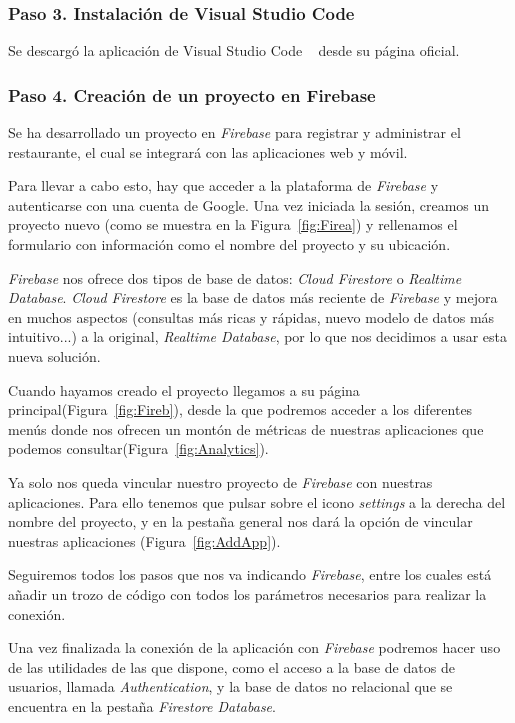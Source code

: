 \subsubsection*{Paso 3. Instalación de Visual Studio Code}
Se descargó la aplicación de Visual Studio Code ~\citep{VSCode} desde su página oficial.

\subsubsection*{Paso 4. Creación de un proyecto en Firebase}

Se ha desarrollado un proyecto en \textit{Firebase} para registrar y administrar el restaurante, el cual se integrará con las aplicaciones web y móvil.

Para llevar a cabo esto, hay que acceder a la plataforma de \textit{Firebase} y autenticarse con una cuenta de Google. Una vez iniciada la sesión, creamos un proyecto nuevo (como se muestra en la Figura~\ref{fig:Firea}) y rellenamos el formulario con información como el nombre del proyecto y su ubicación.

\textit{Firebase} nos ofrece dos tipos de base de datos: \textit{Cloud Firestore} o \textit{Realtime Database}. \textit{Cloud Firestore} es la base de datos más reciente de \textit{Firebase} y mejora en muchos aspectos (consultas más ricas y rápidas, nuevo modelo de datos más intuitivo...) a la original, \textit{Realtime Database}, por lo que nos decidimos a usar esta nueva solución.

Cuando hayamos creado el proyecto llegamos a su página principal(Figura~\ref{fig:Fireb}), desde la que podremos acceder a los diferentes menús donde nos ofrecen un montón de métricas de nuestras aplicaciones que podemos consultar(Figura~\ref{fig:Analytics}).

Ya solo nos queda vincular nuestro proyecto de \textit{Firebase} con nuestras aplicaciones. Para ello tenemos que pulsar sobre el icono \textit{settings} a la derecha del nombre del proyecto, y en la pestaña general nos dará la opción de vincular nuestras aplicaciones (Figura~\ref{fig:AddApp}).



Seguiremos todos los pasos que nos va indicando \textit{Firebase}, entre los cuales está añadir un trozo de código con todos los parámetros necesarios para realizar la conexión.

Una vez finalizada la conexión de la aplicación con \textit{Firebase} podremos hacer uso de las utilidades de las que dispone, como el acceso a la base de datos de usuarios, llamada
\textit{Authentication}, y la base de datos no relacional que se encuentra en la pestaña \textit{Firestore Database}.

